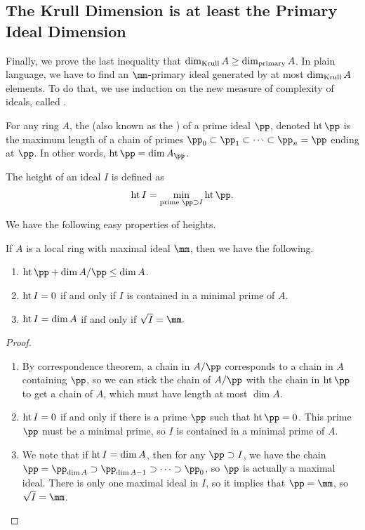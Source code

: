 \subsection{The Krull Dimension is at least the Primary Ideal Dimension}
\label{subsec:dimK_dimP}
Finally, we prove the last inequality that
$\dim_{\text{Krull}} A \geq \dim_{\text{primary}} A$.
In plain language, we have to find an $\mm$-primary
ideal generated by at most $\dim_{\text{Krull}} A$ elements.
To do that, we use induction on the new measure of complexity of ideals, called .
\begin{definition}[Height]
    For any ring $A$, the  
    (also known as the ) of a prime ideal
    $\pp$, denoted $\height \pp$
    is the maximum length of a chain of primes 
    $\pp_0\subset\pp_1\subset\dots\subset\pp_n=\pp$
    ending at $\pp$.
    In other words, $\height\pp = \dim A_\pp$.

    The height of an ideal $I$ is defined as
    $$\height I = \min_{\text{prime }\pp\supset I}
    \height\pp.$$
\end{definition}
We have the following easy properties of heights.
\begin{proposition}
    \label{prop:height}
    If $A$ is a local ring with maximal ideal $\mm$,
    then we have the following.
    \begin{enumerate}[label=(\alph*)]
	\item $\height \pp + \dim A/\pp
	    \leq\dim A$.
	\item $\operatorname{ht} I =0$
    if and only if $I$ is contained in a minimal prime of $A$.
	\item $\operatorname{ht} I= \dim A$ if and only if
    $\sqrt I=\mm.$
    \end{enumerate}
\end{proposition}
\begin{proof}
    \begin{enumerate}[label=(\alph*)]
	\item By correspondence theorem,
    a chain in $A/\pp$ corresponds to a chain in $A$
    containing $\pp$, so we can stick the chain of $A/\pp$
    with the chain in $\height \pp$
    to get a chain of $A$, which must have 
    length at most $\dim A$.
    \item $\operatorname{ht} I=0$ if and only if
    there is a prime $\pp$ such that $\height \pp=0$.
    This prime $\pp$ must be a minimal prime,
    so $I$ is contained in a minimal prime of $A$.
    \item We note that if $\operatorname{ht} I=\dim A$,
    then for any $\pp\supset I$, we have the chain
    $\pp = \pp_{\dim A}\supset\pp_{\dim A-1}
    \supset\dots\supset \pp_0$,
    so $\pp$ is actually a maximal ideal.
    There is only one maximal ideal in $I$,
    so it implies that $\pp=\mm$, so $\sqrt I=\mm$.
    \qedhere
\end{enumerate}
\end{proof}
    
